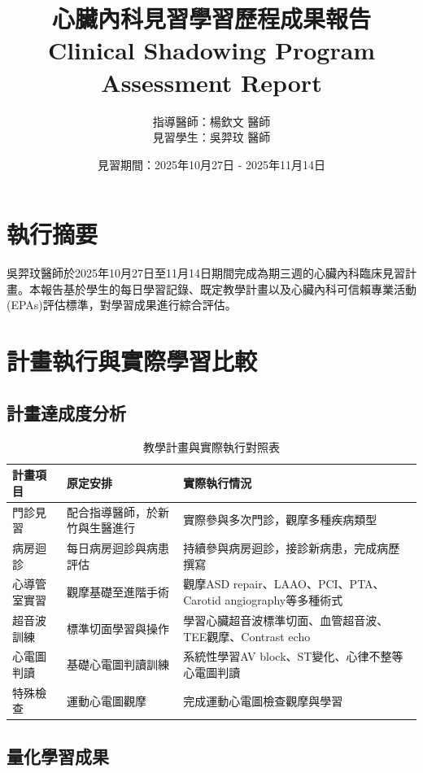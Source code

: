 \documentclass[12pt,a4paper]{article}
\title{\Large \textbf{心臟內科見習學習歷程成果報告}\\
\large Clinical Shadowing Program Assessment Report}
\author{指導醫師：楊欽文 醫師\\
見習學生：吳羿玟 醫師}
\date{見習期間：2025年10月27日 - 2025年11月14日}
\begin{document}
\maketitle

\section{執行摘要}

吳羿玟醫師於2025年10月27日至11月14日期間完成為期三週的心臟內科臨床見習計畫。本報告基於學生的每日學習記錄、既定教學計畫以及心臟內科可信賴專業活動(EPAs)評估標準，對學習成果進行綜合評估。

\section{計畫執行與實際學習比較}

\subsection{計畫達成度分析}

\begin{table}[h]
\centering
\caption{教學計畫與實際執行對照表}
\begin{tabular}{|p{3cm}|p{5cm}|p{6cm}|}
\hline
\textbf{計畫項目} & \textbf{原定安排} & \textbf{實際執行情況} \\
\hline
門診見習 & 配合指導醫師，於新竹與生醫進行 & 實際參與多次門診，觀摩多種疾病類型 \\
\hline
病房迴診 & 每日病房迴診與病患評估 & 持續參與病房迴診，接診新病患，完成病歷撰寫 \\
\hline
心導管室實習 & 觀摩基礎至進階手術 & 觀摩ASD repair、LAAO、PCI、PTA、Carotid angiography等多種術式 \\
\hline
超音波訓練 & 標準切面學習與操作 & 學習心臟超音波標準切面、血管超音波、TEE觀摩、Contrast echo \\
\hline
心電圖判讀 & 基礎心電圖判讀訓練 & 系統性學習AV block、ST變化、心律不整等心電圖判讀 \\
\hline
特殊檢查 & 運動心電圖觀摩 & 完成運動心電圖檢查觀摩與學習 \\
\hline
\end{tabular}
\end{table}

\subsection{量化學習成果}
\end{document}

